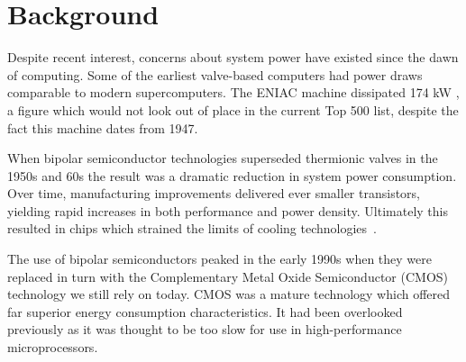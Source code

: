\section{Background}
\label{sec:background}
Despite recent interest, concerns about system power have existed since the dawn of computing. Some of the earliest valve-based computers had power draws comparable to modern supercomputers. The ENIAC machine dissipated 174 kW \cite{birnbaum:2000aa}, a figure which would not look out of place in the current Top 500 list, despite the fact this machine dates from 1947.\golden

When bipolar semiconductor technologies superseded thermionic valves in the 1950s and 60s the result was a dramatic reduction in system power consumption. Over time, manufacturing improvements delivered ever smaller transistors, yielding rapid increases in both performance and power density. Ultimately this resulted in chips which strained the limits of cooling technologies~\cite{jouppi:1994aa}. \golden

The use of bipolar semiconductors peaked in the early 1990s when they were replaced in turn with the Complementary Metal Oxide Semiconductor (CMOS) technology we still rely on today. CMOS was a mature technology which offered far superior energy consumption characteristics. It had been  overlooked previously as it was thought to be too slow for use in high-performance microprocessors. \golden

